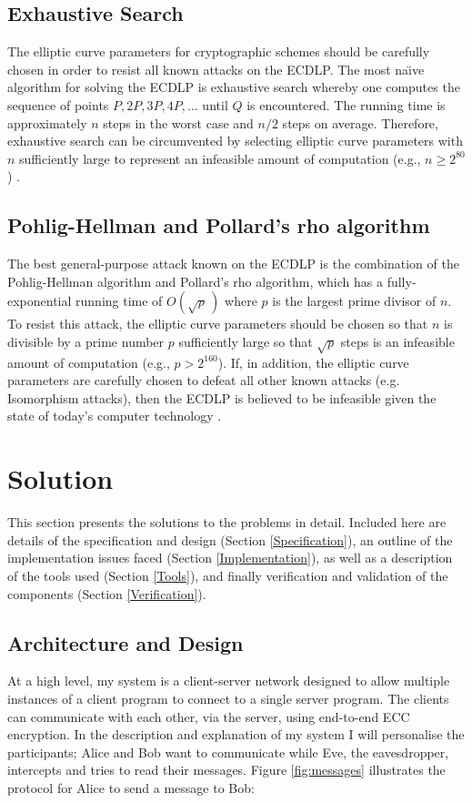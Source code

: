 \documentclass[12pt,a4paper]{article}
\begin{document}
\subsection{Exhaustive Search} \noindent \label{Exhaustive Search}
The elliptic curve parameters for cryptographic schemes should be carefully chosen in order to resist all known attacks on the ECDLP. 
The most na\"{\i}ve algorithm for solving the ECDLP is exhaustive search whereby one computes the sequence of points $P,2P,3P,4P,...$ until $Q$ is encountered. 
The running time is approximately $n$ steps in the worst case and $n/2$ steps on average. 
Therefore, exhaustive search can be circumvented by selecting elliptic curve parameters with $n$ sufficiently large to represent an infeasible amount of computation (e.g., $n \geq 2^{80}$) \cite{hankerson2003guide}.

\subsection{Pohlig-Hellman and Pollard's rho algorithm} \noindent \label{Pohlig-Hellman and Pollard's rho algorithm}
The best general-purpose attack known on the ECDLP is the combination of the Pohlig-Hellman algorithm and Pollard's rho algorithm, 
which has a fully-exponential running time of $O( \sqrt p \,)$ where $p$ is the largest prime divisor of $n$. 
To resist this attack, the elliptic curve parameters should be chosen so that $n$ is divisible by a prime number $p$ sufficiently large 
so that $\sqrt p$ steps is an infeasible amount of computation (e.g., $p > 2^{160}$).
If, in addition, the elliptic curve parameters are carefully chosen to defeat all other known attacks (e.g. Isomorphism attacks), 
then the ECDLP is believed to be infeasible given the state of today's computer technology \cite{hankerson2003guide}.



\section{Solution} \noindent
This section presents the solutions to the problems in detail. 
Included here are details of the specification and design (Section \ref{Specification}), 
an outline of the implementation issues faced (Section \ref{Implementation}), 
as well as a description of the tools used (Section \ref{Tools}), 
and finally verification and validation of the components (Section \ref{Verification}). 

\subsection{Architecture and Design} \noindent \label{Specification}
At a high level, my system is a client-server network designed to allow 
multiple instances of a client program to connect to a single server program. 
The clients can communicate with each other, via the server, using end-to-end ECC encryption. 
In the description and explanation of my system I will personalise the participants; 
Alice and Bob want to communicate while Eve, the eavesdropper, intercepts and tries to read their messages. 
Figure \ref{fig:messages} illustrates the protocol for Alice to send a message to Bob: 
\end{document}
